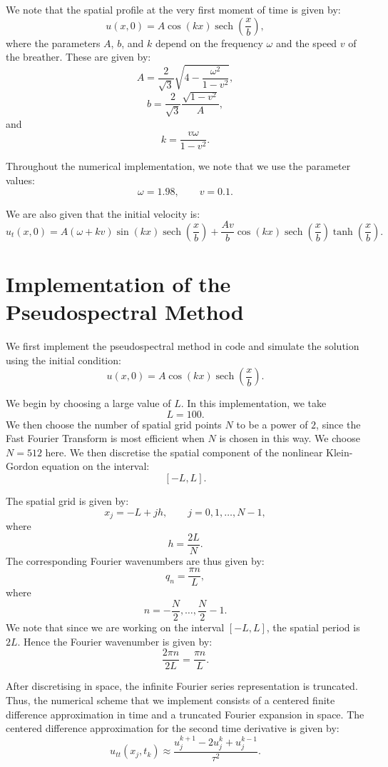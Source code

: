 \documentclass[12pt]{article}
\DeclareMathOperator{\sech}{sech}
\begin{document}
We note that the spatial profile at the very first moment of time is given by:
\[
u(x,0) = A \cos(kx)\sech\left(\frac{x}{b}\right),
\]
where the parameters \(A\), \(b\), and \(k\) depend on the frequency \(\omega\) and the speed \(v\) of the breather. These are given by: 
\[
A = \frac{2}{\sqrt{3}}
\sqrt{4 - \frac{\omega^2}{1-v^2}},
\]
\[
b = \frac{2}{\sqrt{3}}\frac{\sqrt{1-v^2}}{A},
\]
and
\[
k = \frac{v\omega}{1-v^2}.
\]

Throughout the numerical implementation, we note that we use the parameter values:
\[
\omega = 1.98,
\qquad
v = 0.1.
\]

We are also given that the initial velocity is: 
\[
u_t(x,0)
=
A(\omega + kv)\sin(kx)\sech\left(\frac{x}{b}\right)
+
\frac{Av}{b}
\cos(kx)\sech\left(\frac{x}{b}\right)
\tanh\left(\frac{x}{b}\right).
\]

\section*{Implementation of the Pseudospectral Method}

We first implement the pseudospectral method in code and simulate the solution using the initial condition: 
\[
u(x,0) = A \cos(kx)\sech\left(\frac{x}{b}\right).
\]

We begin by choosing a large value of \(L\). In this implementation, we take
\[
L = 100.
\]
We then choose the number of spatial grid points \(N\) to be a power of \(2\), since the Fast Fourier Transform is most efficient when \(N\) is chosen in this way. We choose $N=512$ here. We then discretise the spatial component of the nonlinear Klein-Gordon equation on the interval:
\[
[-L,L].
\]

The spatial grid is given by:
\[
x_j = -L + jh,
\qquad j = 0,1,\ldots,N-1,
\]
where
\[
h = \frac{2L}{N}.
\]
The corresponding Fourier wavenumbers are thus given by: 
\[
q_n = \frac{\pi n}{L},
\]
where
\[
n = -\frac{N}{2}, \ldots, \frac{N}{2}-1.
\]
We note that since we are working on the interval \([-L,L]\), the spatial period is \(2L\). Hence the Fourier wavenumber is given by: 
\[
\frac{2\pi n}{2L} = \frac{\pi n}{L}.
\]

After discretising in space, the infinite Fourier series representation is truncated. Thus, the numerical scheme that we implement consists of a centered finite difference approximation in time and a truncated Fourier expansion in space. The centered difference approximation for the second time derivative is given by:
\[
u_{tt}(x_j,t_k)
\approx
\frac{u_j^{k+1} - 2u_j^k + u_j^{k-1}}{\tau^2}.
\]
\end{document}
